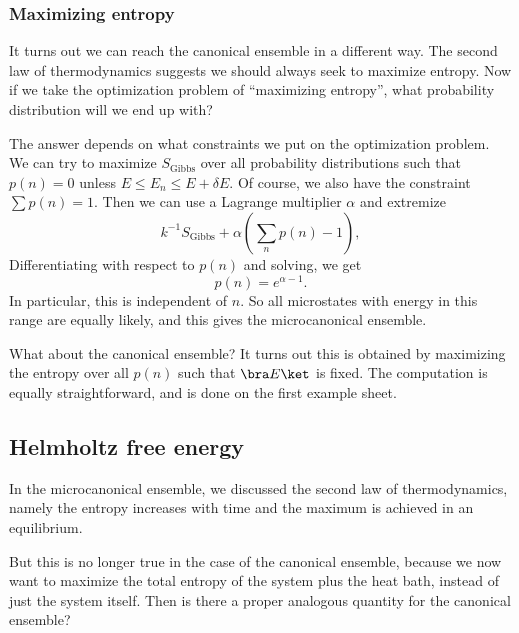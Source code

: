 \documentclass[a4paper]{article}
\begin{document}
\subsubsection*{Maximizing entropy}
It turns out we can reach the canonical ensemble in a different way. The second law of thermodynamics suggests we should always seek to maximize entropy. Now if we take the optimization problem of ``maximizing entropy'', what probability distribution will we end up with?

The answer depends on what constraints we put on the optimization problem. We can try to maximize $S_{\mathrm{Gibbs}}$ over all probability distributions such that $p(n) = 0$ unless $E \leq E_n \leq E + \delta E$. Of course, we also have the constraint $\sum p(n) = 1$. Then we can use a Lagrange multiplier $\alpha$ and extremize
\[
  k^{-1}S_{\mathrm{Gibbs}} + \alpha \left(\sum_n p(n) - 1\right),
\]
Differentiating with respect to $p(n)$ and solving, we get
\[
  p(n) = e^{\alpha - 1}.
\]
In particular, this is independent of $n$. So all microstates with energy in this range are equally likely, and this gives the microcanonical ensemble.

What about the canonical ensemble? It turns out this is obtained by maximizing the entropy over all $p(n)$ such that $\bra E\ket$ is fixed. The computation is equally straightforward, and is done on the first example sheet.

\subsection{Helmholtz free energy}
In the microcanonical ensemble, we discussed the second law of thermodynamics, namely the entropy increases with time and the maximum is achieved in an equilibrium.

But this is no longer true in the case of the canonical ensemble, because we now want to maximize the total entropy of the system plus the heat bath, instead of just the system itself. Then is there a proper analogous quantity for the canonical ensemble?

%
\end{document}

